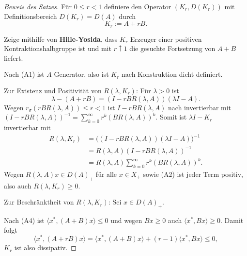 \begin{proof}[Beweis des Satzes]
\par
Für $0\leq r < 1$ definiere den Operator $(K_r, D(K_r))$ mit Definitionsbereich $D(K_r)=D(A)$ durch
\begin{equation}
K_r:= A+rB.
\end{equation}

\par
Zeige mithilfe von \textbf{Hille-Yosida}, dass $K_r$ Erzeuger einer positiven Kontraktionshalbgruppe ist und mit  $r\uparrow 1$ die gesuchte Fortsetzung von $A+B$ liefert.

\par 
Nach (A1) ist $A$ Generator, also ist $K_r$ nach Konstruktion dicht definiert. 

\par 
Zur Existenz und Positivität von $R(\lambda, K_r)$: Für $\lambda>0$ ist
\begin{equation*}
\lambda- (A+rB)=(I-rBR(\lambda, A))(\lambda I-A).
\end{equation*}
Wegen $r_\sigma(rBR(\lambda, A))\leq r< 1$ ist $I-rBR(\lambda, A)$ nach  invertierbar mit $(I-rBR(\lambda, A))^{-1}=\sum_{k=0}^\infty r^k (BR(\lambda, A))^k$. Somit ist $\lambda I - K_r$ invertierbar mit
\begin{align*}
R(\lambda, K_r)
&=\big((I-rBR(\lambda, A))(\lambda I-A)\big)^{-1}\\
&=R(\lambda, A)(I-rBR(\lambda, A))^{-1}\\
&=R(\lambda, A)\sum_{k=0}^\infty r^k (BR(\lambda, A))^k.
\end{align*}
Wegen $R(\lambda, A)x\in D(A)_+$ für alle $x\in X_+$ sowie (A2) ist jeder Term positiv, also auch $R(\lambda, K_r)\geq0$. 

\par 
Zur Beschränktheit von $R(\lambda,K_r)$: Sei $x\in D(A)_+$. 


Nach (A4) ist $\langle x^*, (A+B)x\rangle\leq 0$ und wegen $Bx\geq0$ auch $\langle x^*, Bx\rangle \geq0$. Damit folgt
\begin{equation*}
\langle x^*, (A+rB)x\rangle = \langle x^*, (A+B)x\rangle + (r-1)\langle x^*, Bx\rangle \leq  0,
\end{equation*}
$K_r$ ist also dissipativ.


\end{proof}
